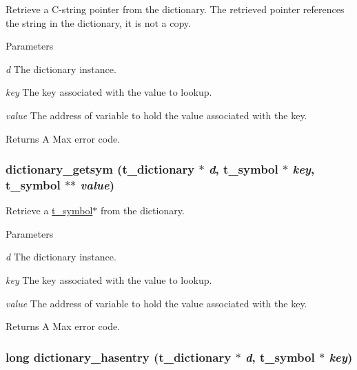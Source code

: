 Retrieve a C-\/string pointer from the dictionary. The retrieved pointer references the string in the dictionary, it is not a copy.


\begin{DoxyParams}{Parameters}
\item[{\em d}]The dictionary instance. \item[{\em key}]The key associated with the value to lookup. \item[{\em value}]The address of variable to hold the value associated with the key. \end{DoxyParams}
\begin{DoxyReturn}{Returns}
A Max error code. 
\end{DoxyReturn}
\hypertarget{group__dictionary_ga0e5747682765d9a320bb9ccf37d9215d}{
\subsubsection[{dictionary\_\-getsym}]{ dictionary\_\-getsym ({\bf t\_\-dictionary} $\ast$ {\em d}, \/  {\bf t\_\-symbol} $\ast$ {\em key}, \/  {\bf t\_\-symbol} $\ast$$\ast$ {\em value})}}
\label{group__dictionary_ga0e5747682765d9a320bb9ccf37d9215d}


Retrieve a \hyperlink{structt__symbol}{t\_\-symbol}$\ast$ from the dictionary. 
\begin{DoxyParams}{Parameters}
\item[{\em d}]The dictionary instance. \item[{\em key}]The key associated with the value to lookup. \item[{\em value}]The address of variable to hold the value associated with the key. \end{DoxyParams}
\begin{DoxyReturn}{Returns}
A Max error code. 
\end{DoxyReturn}
\hypertarget{group__dictionary_ga3da77635f06156cc82b4f6c7633b69c6}{
\subsubsection[{dictionary\_\-hasentry}]{\setlength{\rightskip}{0pt plus 5cm}long dictionary\_\-hasentry ({\bf t\_\-dictionary} $\ast$ {\em d}, \/  {\bf t\_\-symbol} $\ast$ {\em key})}}
\label{group__dictionary_ga3da77635f06156cc82b4f6c7633b69c6}


